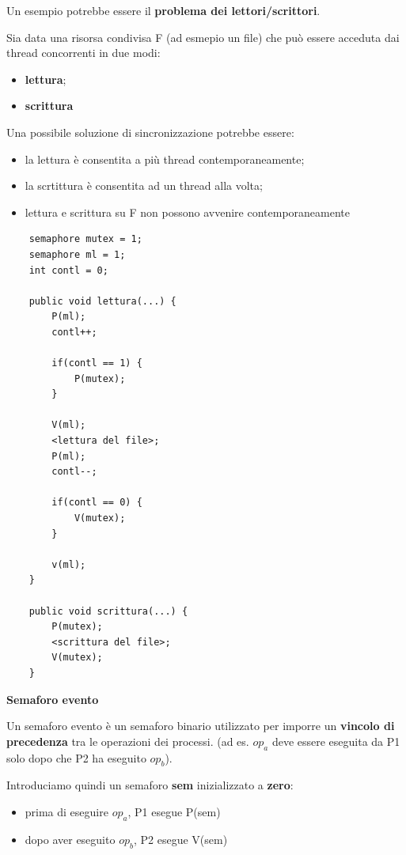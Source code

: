 \documentclass{article}
\begin{document}
Un esempio potrebbe essere il \textbf{problema dei lettori/scrittori}.

Sia data una risorsa condivisa F (ad esmepio un file) che può essere acceduta dai thread concorrenti in due modi:
\begin{itemize}
    \item \textbf{lettura};
    \item \textbf{scrittura}
\end{itemize}

\vspace{3mm}
Una possibile soluzione di sincronizzazione potrebbe essere:
\begin{itemize}
    \item la lettura è consentita a più thread contemporaneamente;
    \item la scrtittura è consentita ad un thread alla volta;
    \item lettura e scrittura su F non possono avvenire contemporaneamente
\end{itemize}

\begin{lstlisting}
    semaphore mutex = 1;
    semaphore ml = 1;
    int contl = 0;

    public void lettura(...) {
        P(ml);
        contl++;

        if(contl == 1) {
            P(mutex);
        }

        V(ml);
        <lettura del file>;
        P(ml);
        contl--;

        if(contl == 0) {
            V(mutex);
        }

        v(ml);
    }

    public void scrittura(...) {
        P(mutex);
        <scrittura del file>;
        V(mutex);
    }
\end{lstlisting}

\vspace{5mm}
\textbf{Semaforo evento}

\vspace{3mm}
Un semaforo evento è un semaforo binario utilizzato per imporre un \textbf{vincolo di precedenza} tra le operazioni dei processi. 
(ad es. $op_a$ deve essere eseguita da P1 solo dopo che P2 ha eseguito $op_b$).

\vspace{3mm}
Introduciamo quindi un semaforo \textbf{sem} inizializzato a \textbf{zero}:
\begin{itemize}
    \item prima di eseguire $op_a$, P1 esegue P(sem)
    \item dopo aver eseguito $op_b$, P2 esegue V(sem)
\end{itemize}
\end{document}
